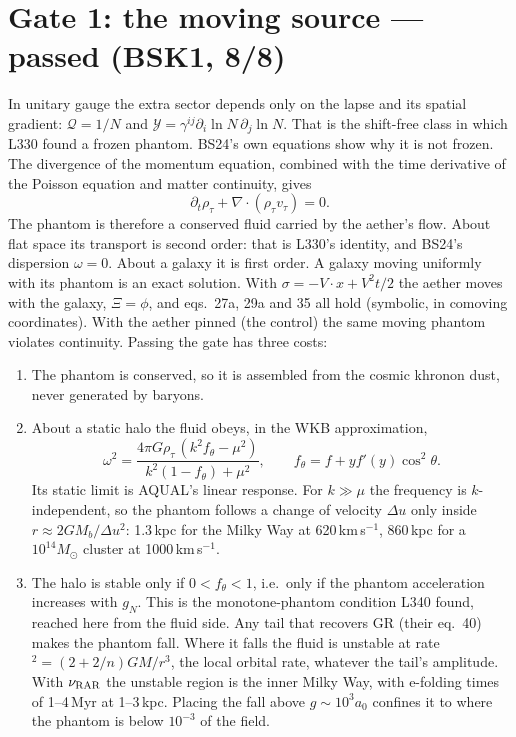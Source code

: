 \documentclass[10pt]{article}
\begin{document}
\section{Gate 1: the moving source --- passed (BSK1, 8/8)}
In unitary gauge the extra sector depends only on the lapse and its spatial gradient: $\mathcal Q=1/N$ and $\mathcal Y=\gamma^{ij}\partial_i\ln N\,\partial_j\ln N$. That is the shift-free class in which L330 found a frozen phantom.
BS24's own equations show why it is not frozen. The divergence of the momentum equation, combined with the time derivative of the Poisson equation and matter continuity, gives
\[
\partial_t\rho_\tau+\nabla\!\cdot(\rho_\tau v_\tau)=0 .
\]
The phantom is therefore a conserved fluid carried by the aether's flow. About flat space its transport is second order: that is L330's identity, and BS24's dispersion $\omega=0$. About a galaxy it is first order.
A galaxy moving uniformly with its phantom is an exact solution. With $\sigma=-V\!\cdot x+V^2t/2$ the aether moves with the galaxy, $\Xi=\phi$, and eqs.~27a, 29a and 35 all hold (symbolic, in comoving coordinates). With the aether pinned (the control) the same moving phantom violates continuity.
Passing the gate has three costs:
\begin{enumerate}[label=(\roman*)]
\item The phantom is conserved, so it is assembled from the cosmic khronon dust, never generated by baryons.
\item About a static halo the fluid obeys, in the WKB approximation,
\begin{equation}
\omega^2=\frac{4\pi G\rho_\tau\,(k^2f_\theta-\mu^2)}{k^2(1-f_\theta)+\mu^2},\qquad f_\theta=f+yf'(y)\cos^2\theta .
\end{equation}
Its static limit is AQUAL's linear response. For $k\gg\mu$ the frequency is $k$-independent, so the phantom follows a change of velocity $\Delta u$ only inside $r\approx2GM_b/\Delta u^2$: 1.3\,kpc for the Milky Way at 620\,km\,s$^{-1}$, 860\,kpc for a $10^{14}M_\odot$ cluster at 1000\,km\,s$^{-1}$.
\item The halo is stable only if $0<f_\theta<1$, i.e.\ only if the phantom acceleration increases with $g_N$. This is the monotone-phantom condition L340 found, reached here from the fluid side.
Any tail that recovers GR (their eq.~40) makes the phantom fall. Where it falls the fluid is unstable at rate$^2=(2+2/n)GM/r^3$, the local orbital rate, whatever the tail's amplitude. With $\nu_{\rm RAR}$ the unstable region is the inner Milky Way, with e-folding times of 1--4\,Myr at 1--3\,kpc. Placing the fall above $g\sim10^3a_0$ confines it to where the phantom is below $10^{-3}$ of the field.
\end{enumerate}
\end{document}
